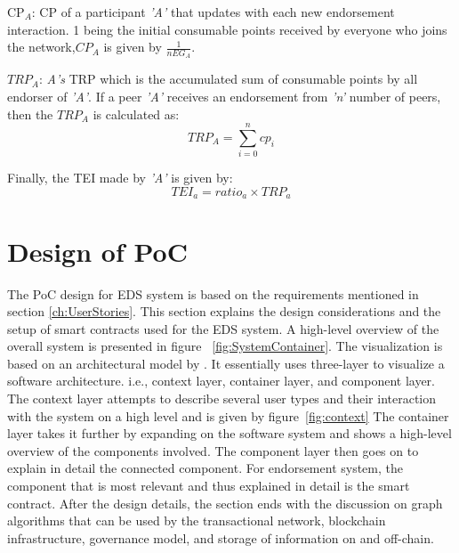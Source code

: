 \acrshort{CP}$_A$: \ac{CP} of a participant \textit{'A'} that updates with each
new endorsement interaction. 1 being the initial consumable points received by
everyone who joins the network,\textit{$CP_A$} is given by $\frac{1}{nEG_A}$.

\textit{$TRP_A$}: \textit{A's} \ac{TRP} which is the accumulated sum
of consumable points by all endorser of \textit{'A'}. If a peer \textit{'A'} receives an
endorsement from \textit{'n'} number of peers, then the \textit{$TRP_A$} is calculated
as:
\begin{equation}
	TRP_A  = \sum_{i=0}^{n}cp_{i}
\end{equation}

Finally, the \ac{TEI} made by \textit{'A'} is given by: \\
\begin{equation}
	TEI_a = ratio_a \times TRP_a
\end{equation}
%

\section{Design of PoC}\label{sec:pocDesign}
The PoC design for \ac{EDS} system is based on the requirements mentioned in
section \ref{ch:UserStories}. This section explains the design considerations
and the setup of smart contracts used for the \acrshort{EDS} system. A
high-level overview of the overall system is presented in figure
~\ref{fig:SystemContainer}. The visualization is based on an architectural
model by \cite{brown2013software}.  It essentially uses three-layer to
visualize a software architecture. i.e., context layer, container layer, and
component layer. The context layer attempts to describe several user types and
their interaction with the system on a high level and is given by
figure~\ref{fig:context} The container layer takes it further by expanding on
the software system and shows a high-level overview of the components involved.
The component layer then goes on to explain in detail the connected component.
For endorsement system, the component that is most relevant and thus explained
in detail is the smart contract.
After the design details, the section ends with the discussion on graph
algorithms that can be used by the transactional network, blockchain
infrastructure, governance model, and storage of information on and off-chain.


